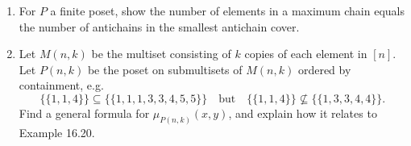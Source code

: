 \documentclass[11pt,letterpaper]{article}
\begin{document}
\begin{enumerate}
\item For $P$ a finite poset, show the number of elements in a maximum chain equals the number of antichains in the smallest antichain cover.
 
\item Let $M(n,k)$ be the multiset consisting of $k$ copies of each element in $[n]$.
Let $P(n,k)$ be the poset on submultisets of $M(n,k)$ ordered by containment, e.g. 
\[
\{\{1,1,4\}\} \subseteq \{\{1,1,1,3,3,4,5,5\}\} \quad \mbox{but} \quad \{\{1,1,4\}\} \not\subseteq \{\{1,3,3,4,4\}\}.
\]
Find a general formula for $\mu_{P(n,k)}(x,y)$, and explain how it relates to Example 16.20.



\end{enumerate}
\end{document}
